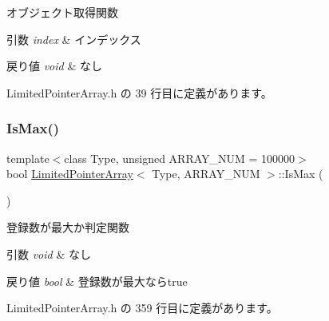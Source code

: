 オブジェクト取得関数 


\begin{DoxyParams}{引数}
{\em index} & インデックス \\
\hline
\end{DoxyParams}

\begin{DoxyRetVals}{戻り値}
{\em void} & なし \\
\hline
\end{DoxyRetVals}


 Limited\+Pointer\+Array.\+h の 39 行目に定義があります。

\mbox{\label{class_limited_pointer_array_a8bd3a7ea969f307c35934a1bf2803b40}} 
\subsubsection{\texorpdfstring{Is\+Max()}{IsMax()}}
{\footnotesize\ttfamily template$<$class Type, unsigned A\+R\+R\+A\+Y\+\_\+\+N\+UM = 100000$>$ \\
bool \mbox{\hyperlink{class_limited_pointer_array}{Limited\+Pointer\+Array}}$<$ Type, A\+R\+R\+A\+Y\+\_\+\+N\+UM $>$\+::Is\+Max (\begin{DoxyParamCaption}{ }\end{DoxyParamCaption})\hspace{0.3cm}{\ttfamily [inline]}}



登録数が最大か判定関数 


\begin{DoxyParams}{引数}
{\em void} & なし \\
\hline
\end{DoxyParams}

\begin{DoxyRetVals}{戻り値}
{\em bool} & 登録数が最大ならtrue \\
\hline
\end{DoxyRetVals}


 Limited\+Pointer\+Array.\+h の 359 行目に定義があります。

\mbox{\label{class_limited_pointer_array_a7cf64a1731ab6d0d63182b6c223fae0b}} 
